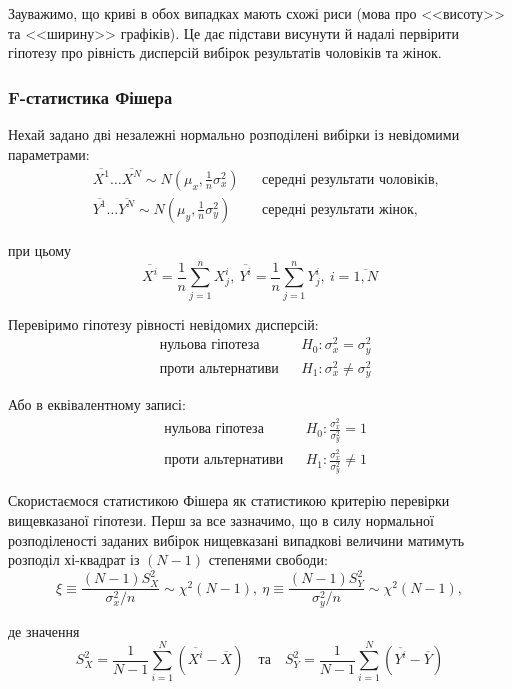 Зауважимо, що криві в обох випадках мають схожі риси (мова про <<висоту>> та <<ширину>> графіків). 
Це дає підстави висунути й надалі первірити гіпотезу про рівність дисперсій вибірок результатів чоловіків 
та жінок.

\subsubsection{F-статистика Фішера}

Нехай задано дві незалежні нормально розподілені вибірки із невідомими параметрами: 
\begin{align*}
    &\overline{X^1}\ldots \overline{X^N}\sim N(\mu_x,\tfrac{1}{n}\sigma_x^2) && \text{середні результати чоловіків,} \\
    &\overline{Y^1}\ldots \overline{Y^N}\sim N(\mu_y,\tfrac{1}{n}\sigma_y^2) && \text{середні результати жінок,}
\end{align*}

при цьому
\[ \overline{X^i}=\frac{1}{n}\sum\limits_{j=1}^nX^i_j,\ 
   \overline{Y^i}=\frac{1}{n}\sum\limits_{j=1}^nY^i_j,\ i=\overline{1,N} \]

Перевіримо гіпотезу рівності невідомих дисперсій:
\begin{align*}
    &\text{нульова гіпотеза} && H_0: \sigma_x^2=\sigma_y^2 \\
    &\text{проти альтернативи} && H_1: \sigma_x^2\neq\sigma_y^2
\end{align*}

Або в еквівалентному записі:
\begin{align}
    &\text{нульова гіпотеза} && H_0:  \frac{\sigma_x^2}{\sigma_y^2}=1 \label{formula: F-test hypothesis} \\
    &\text{проти альтернативи} && H_1: \frac{\sigma_x^2}{\sigma_y^2}\neq 1 \nonumber
\end{align}

Скористаємося статистикою Фішера як статистикою критерію перевірки вищевказаної гіпотези. 
Перш за все зазначимо, що в силу нормальної розподіленості заданих вибірок нищевказані випадкові 
величини матимуть розподіл хі-квадрат із $(N-1)$ степенями свободи: 
\begin{equation} 
    \xi\equiv\frac{(N-1)S_X^2}{\sigma_x^2/n} \sim \chi^2(N-1),\ 
    \eta\equiv\frac{(N-1)S_Y^2}{\sigma_y^2/n} \sim \chi^2(N-1), \label{formula: F-test chi distributed}
\end{equation}

де значення
\begin{equation*}
    S_X^2=\frac{1}{N-1}\sum\limits_{i=1}^N(\overline{X^i}-\overline{X})\quad \text{та} \quad
    S_Y^2=\frac{1}{N-1}\sum\limits_{i=1}^N(\overline{Y^i}-\overline{Y})
\end{equation*}

